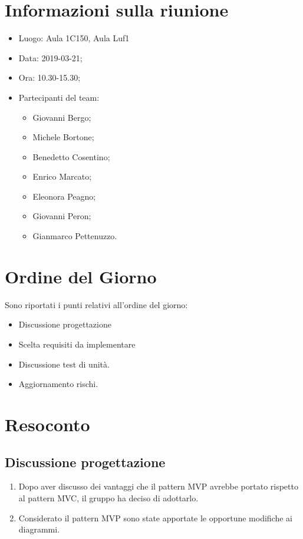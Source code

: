 \documentclass[11pt,a4paper]{article}
\begin{document}
	\section{Informazioni sulla riunione}
	\begin{itemize}
		\item Luogo: Aula 1C150, Aula Luf1
		\item Data: 2019-03-21;
		\item Ora: 10.30-15.30;
		\item Partecipanti del team:
			\begin{itemize}
				\item Giovanni Bergo;
				\item Michele Bortone;
				\item Benedetto Cosentino;
				\item Enrico Marcato;
				\item Eleonora Peagno;
				\item Giovanni Peron;
				\item Gianmarco Pettenuzzo.
				
			\end{itemize}
	\end{itemize}
	
	\section{Ordine del Giorno}
	Sono riportati i punti relativi all'ordine del giorno:
	\begin{itemize}
		\item Discussione progettazione
		\item  Scelta requisiti da implementare
		\item Discussione test di unità.
		\item Aggiornamento rischi.
	\end{itemize}
	
	\section{Resoconto}

	\subsection{Discussione progettazione}
	\begin{enumerate}
		\item Dopo aver discusso dei vantaggi che il pattern MVP avrebbe portato rispetto al pattern MVC, il gruppo ha deciso di adottarlo.
		\item Considerato il pattern MVP sono state apportate le opportune modifiche ai diagrammi.
		

	\end{enumerate}
	
\end{document}
